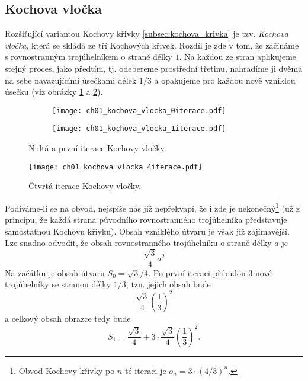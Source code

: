 \subsection{Kochova vločka}\label{subsec:kochova_vlocka}
Rozšiřující variantou Kochovy křivky \ref{subsec:kochova_krivka} je tzv. \emph{Kochova vločka}, která se skládá ze tří Kochových křivek. Rozdíl je zde v tom, že začínáme s rovnostranným trojúhelníkem o straně délky $1$. Na každou ze stran aplikujeme stejný proces, jako předtím, tj. odebereme prostřední třetinu, nahradíme ji dvěma na sebe navazujícími úsečkami délek $1/3$ a opakujeme pro každou nově vzniklou úsečku (viz obrázky \ref{fig:kochova_vlocka_dve_iterace} a \ref{fig:kochova_krivka_5iterace}).
\begin{figure}[h]
    \centering
    \begin{subfigure}{\subfigwidth}
        \centering
        \texttt{[image: ch01\_kochova\_vlocka\_0iterace.pdf]}
    \end{subfigure}
    \qquad
    \begin{subfigure}{\subfigwidth}
        \centering
        \texttt{[image: ch01\_kochova\_vlocka\_1iterace.pdf]}
    \end{subfigure}
    \caption{Nultá a první iterace Kochovy vločky.}
    \label{fig:kochova_vlocka_dve_iterace}
\end{figure}
\begin{figure}[h]
    \centering
    \texttt{[image: ch01\_kochova\_vlocka\_4iterace.pdf]}
    \caption{Čtvrtá iterace Kochovy vločky.}
    \label{fig:kochova_krivka_5iterace}
\end{figure}
Podíváme-li se na obvod, nejspíše nás již nepřekvapí, že i zde je nekonečný\footnote{Obvod Kochovy křivky po $n$-té iteraci je $o_n=3\cdot(4/3)^{n}$.} (už z principu, že každá strana původního rovnostranného trojúhelníka představuje samostatnou Kochovu křivku). Obsah vzniklého útvaru je však již zajímavější. Lze snadno odvodit, že obsah rovnostranného trojúhelníku o straně délky $a$ je
\begin{equation*}
    \dfrac{\sqrt{3}}{4}a^2
\end{equation*}
Na začátku je obsah útvaru $S_0=\sqrt{3}/4$. Po první iteraci přibudou 3 nové trojúhelníky se stranou délky $1/3$, tzn. jejich obsah bude
\begin{equation*}
    \dfrac{\sqrt{3}}{4}\left(\dfrac{1}{3}\right)^2
\end{equation*}
a celkový obsah obrazce tedy bude
\begin{equation*}
    S_1=\dfrac{\sqrt{3}}{4}+3\cdot\dfrac{\sqrt{3}}{4}\left(\dfrac{1}{3}\right)^2.
\end{equation*}
